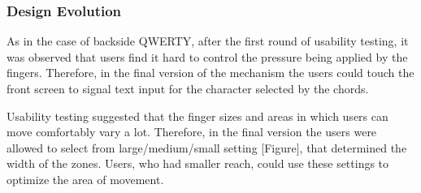 \subsubsection{Design Evolution}

As in the case of backside QWERTY, after the first round of usability
testing, it was observed that users find it hard to control the
pressure being applied by the fingers. Therefore, in the final version
of the mechanism the users could touch the front screen to signal text
input for the character selected by the chords.

Usability testing suggested that the finger sizes and areas in which
users can move comfortably vary a lot. Therefore, in the final version
the users were allowed to select from large/medium/small setting
[Figure], that determined the width of the zones. Users, who had
smaller reach, could use these settings to optimize the area of
movement.
